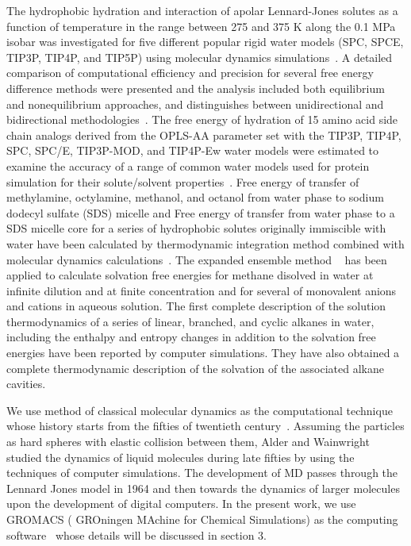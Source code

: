The hydrophobic hydration and interaction of apolar Lennard-Jones solutes as a  function of temperature in the range between 275 and 375 K along the 0.1 MPa isobar was investigated for five different popular rigid water models (SPC, SPCE, TIP3P, TIP4P, and TIP5P) using molecular dynamics simulations~\citep{paschek2004temperature}.  A detailed comparison of computational efficiency and precision for several free energy difference methods were presented  and the analysis included both equilibrium and nonequilibrium approaches, and distinguishes between unidirectional and bidirectional methodologies~\citep{ytreberg2006comparison}. The free energy of hydration of 15 amino acid side chain analogs derived from the OPLS-AA parameter set with the TIP3P, TIP4P, SPC, SPC/E, TIP3P-MOD, and TIP4P-Ew water models were estimated  to examine the accuracy of a range of common water models used for protein simulation for their solute/solvent properties~\citep{shirts2005solvation}. Free energy of transfer of methylamine, octylamine, methanol, and octanol from water phase to sodium dodecyl sulfate (SDS) micelle and Free energy of transfer from water phase to a SDS micelle core  for a series of hydrophobic solutes originally immiscible with water  have been calculated by thermodynamic integration method combined with molecular dynamics calculations~\citep{fujimoto2010molecular,fujimoto2012molecular}. The expanded ensemble method ~\citep{lyubartsev1992new} has been  applied to calculate solvation free energies for methane disolved in water at infinite dilution and at finite concentration and for several of monovalent anions and cations in aqueous solution\citep{lyubartsev1996calculations}. The first complete description of the solution thermodynamics of a series of linear, branched, and cyclic alkanes in water, including the enthalpy and entropy changes in addition to the solvation free energies have been reported  by computer simulations\citep{gallicchio2000enthalpy}. They have also obtained a complete thermodynamic description of the solvation of the associated alkane cavities.

We use method of classical molecular dynamics as the computational technique whose history starts from the fifties of twentieth century~\citep{Alder1957}. Assuming the particles as hard spheres
with elastic collision between them, Alder and Wainwright studied the dynamics of liquid molecules during late fifties \citep{Allen1989} by using the techniques of computer simulations. The development of MD passes through the Lennard Jones model in 1964 \citep{Rahman1964} and 
then towards the dynamics of larger molecules \citep{Kremer2003} upon the development of digital computers. In the present work, we use GROMACS ( GROningen MAchine for Chemical Simulations) as the computing software~\citep{Gromacs-manual} whose details will be discussed in section 3. 


